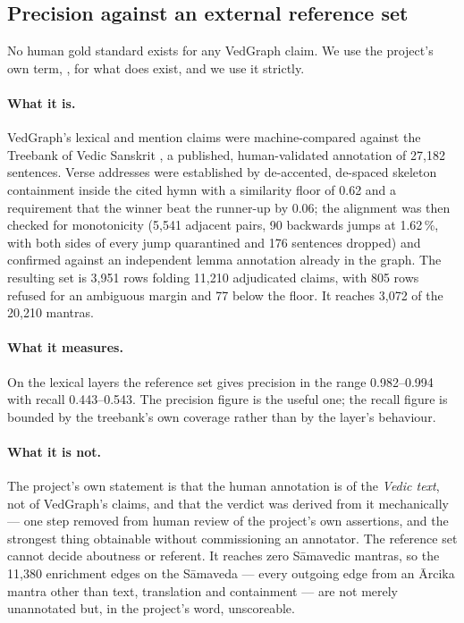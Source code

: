 \subsection{Precision against an external reference set}
\label{sec:gold}

No human gold standard exists for any VedGraph claim. We use the project's own term,
, for what does exist, and we
use it strictly.

\paragraph{What it is.} VedGraph's lexical and mention claims were machine-compared
against the Treebank of Vedic Sanskrit \citep{hellwig2020vedic}, a published,
human-validated annotation of 27{,}182 sentences. Verse addresses were established by
de-accented, de-spaced skeleton containment inside the cited hymn with a similarity
floor of 0.62 and a requirement that the winner beat the runner-up by 0.06; the
alignment was then checked for monotonicity (5{,}541 adjacent pairs, 90 backwards
jumps at 1.62\,\%, with both sides of every jump quarantined and 176 sentences
dropped) and confirmed against an independent lemma annotation already in the graph.
The resulting set is 3{,}951 rows folding 11{,}210 adjudicated claims, with 805 rows
refused for an ambiguous margin and 77 below the floor. It reaches 3{,}072 of the
20{,}210 mantras.

\paragraph{What it measures.} On the lexical layers the reference set gives precision
in the range 0.982--0.994 with recall 0.443--0.543. The precision figure is the
useful one; the recall figure is bounded by the treebank's own coverage rather than
by the layer's behaviour.

\paragraph{What it is not.} The project's own statement is that the human annotation
is of the \emph{Vedic text}, not of VedGraph's claims, and that the verdict was
derived from it mechanically --- one step removed from human review of the project's
own assertions, and the strongest thing obtainable without commissioning an
annotator. The reference set cannot decide aboutness or referent. It reaches zero
S\=amavedic mantras, so the 11{,}380 enrichment edges on the S\=amaveda --- every
outgoing edge from an \=Arcika mantra other than text, translation and containment
--- are not
merely unannotated but, in the project's word, unscoreable.

